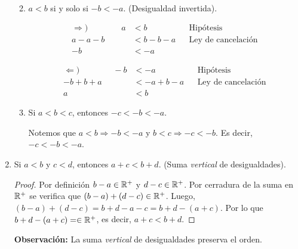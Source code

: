 \begin{enumerate}[label=\alph*)]
\begin{enumerate}[label=\roman*)]
\begin{center}
\begin{minipage}[r]{.3\linewidth}
\begin{align*}
   \end{align*}
  \end{minipage}
  \end{center}
  \item $a<b$ si y solo si $-b<-a$. (Desigualdad invertida).
  \begin{center}\vspace{-1em}
  \begin{minipage}[l]{.3\linewidth}
   \begin{align*}
    \Rightarrow) \qquad \qquad
    a &< b && \text{Hipótesis}\\
    a -a -b &< b -b -a && \text{Ley de cancelación}\\
    -b &< -a%
   \end{align*}
  \end{minipage}%
  \begin{minipage}[r]{.3\linewidth}
   \begin{align*}
    \Leftarrow) \qquad \qquad
    -b &< -a && \text{Hipótesis}\\
    -b + b +a &< -a +b -a && \text{Ley de cancelación}\\
    a &< b &&%
   \end{align*}
  \end{minipage}
  \end{center}
  
  \item Si $a<b<c$, entonces $-c<-b<-a$.
  
  Notemos que $a < b \Rightarrow -b < -a$ y $b < c\Rightarrow -c < -b$. Es decir, $-c<-b<-a$.

 \end{enumerate} %

 \item Si $a<b$ y $c < d$, entonces $a+c<b+d$. (Suma \textit{vertical} de desigualdades).
 \begin{proof} 
 Por definición $b-a\in \mathbb{R}^+$ y $d-c\in \mathbb{R}^+$. Por cerradura de la suma en $\mathbb{R}^+$ se verifica que $(b-a)+(d-c)\in \mathbb{R}^+$. Luego, $(b-a)+(d-c)=b+d-a-c=b+d-(a+c)$. Por lo que $b+d-(a+c)=\in \mathbb{R}^+$, es decir, $a+c<b+d$.
 \end{proof}
 \textbf{Observación:} La suma \textit{vertical} de desigualdades preserva el orden.


\end{enumerate}
